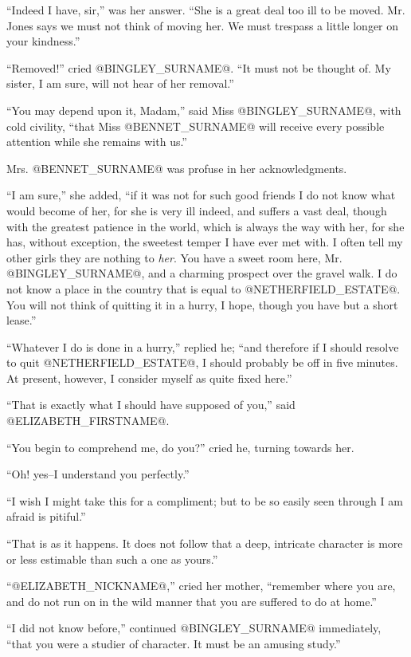 ``Indeed I have, sir,'' was her answer. ``She is a great deal too ill to be
moved. Mr. Jones says we must not think of moving her. We must trespass
a little longer on your kindness.''

``Removed!'' cried @BINGLEY_SURNAME@. ``It must not be thought of. My sister, I am
sure, will not hear of her removal.''

``You may depend upon it, Madam,'' said Miss @BINGLEY_SURNAME@, with cold civility,
``that Miss @BENNET_SURNAME@ will receive every possible attention while she
remains with us.''

Mrs. @BENNET_SURNAME@ was profuse in her acknowledgments.

``I am sure,'' she added, ``if it was not for such good friends I do not
know what would become of her, for she is very ill indeed, and suffers
a vast deal, though with the greatest patience in the world, which is
always the way with her, for she has, without exception, the sweetest
temper I have ever met with. I often tell my other girls they are
nothing to \textit{her}. You have a sweet room here, Mr. @BINGLEY_SURNAME@, and a
charming prospect over the gravel walk. I do not know a place in the
country that is equal to @NETHERFIELD_ESTATE@. You will not think of quitting it
in a hurry, I hope, though you have but a short lease.''

``Whatever I do is done in a hurry,'' replied he; ``and therefore if I
should resolve to quit @NETHERFIELD_ESTATE@, I should probably be off in five
minutes. At present, however, I consider myself as quite fixed here.''

``That is exactly what I should have supposed of you,'' said @ELIZABETH_FIRSTNAME@.

``You begin to comprehend me, do you?'' cried he, turning towards her.

``Oh! yes--I understand you perfectly.''

``I wish I might take this for a compliment; but to be so easily seen
through I am afraid is pitiful.''

``That is as it happens. It does not follow that a deep, intricate
character is more or less estimable than such a one as yours.''

``@ELIZABETH_NICKNAME@,'' cried her mother, ``remember where you are, and do not run on in
the wild manner that you are suffered to do at home.''

``I did not know before,'' continued @BINGLEY_SURNAME@ immediately, ``that you were a
studier of character. It must be an amusing study.''

